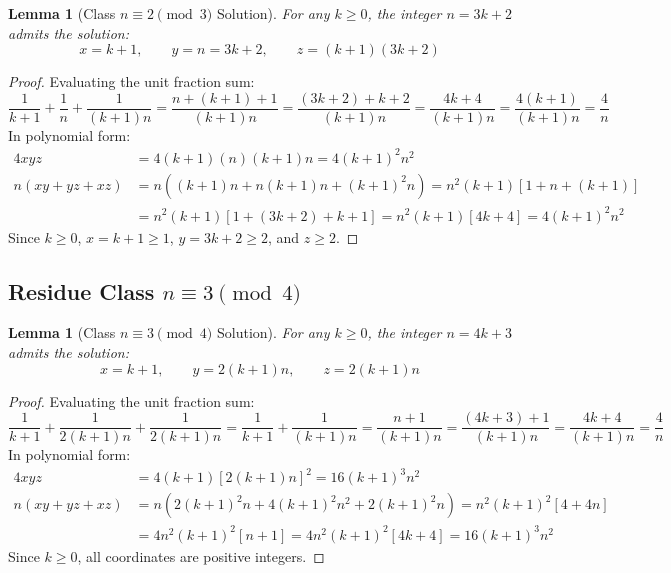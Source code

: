 \documentclass[11pt,a4paper]{article}
\newtheorem{lemma}[theorem]{Lemma}
\theoremstyle{definition}
\begin{document}
\begin{lemma}[Class $n \equiv 2 \pmod 3$ Solution]\label{lem:mod3_2}
For any $k \ge 0$, the integer $n = 3k + 2$ admits the solution:
\begin{equation}\label{eq:sol_mod3_2}
x = k + 1, \qquad y = n = 3k + 2, \qquad z = (k + 1)(3k + 2)
\end{equation}
\end{lemma}

\begin{proof}
Evaluating the unit fraction sum:
\[ \frac{1}{k+1} + \frac{1}{n} + \frac{1}{(k+1)n} = \frac{n + (k+1) + 1}{(k+1)n} = \frac{(3k+2) + k + 2}{(k+1)n} = \frac{4k+4}{(k+1)n} = \frac{4(k+1)}{(k+1)n} = \frac{4}{n} \]
In polynomial form:
\begin{align*}
4 x y z &= 4 (k+1)(n)(k+1)n = 4 (k+1)^2 n^2 \\
n (x y + y z + x z) &= n \left( (k+1)n + n(k+1)n + (k+1)^2 n \right) = n^2 (k+1) [ 1 + n + (k+1) ] \\
&= n^2 (k+1) [ 1 + (3k+2) + k + 1 ] = n^2 (k+1) [ 4k + 4 ] = 4 (k+1)^2 n^2
\end{align*}
Since $k \ge 0$, $x = k+1 \ge 1$, $y = 3k+2 \ge 2$, and $z \ge 2$.
\end{proof}

\subsection{Residue Class \texorpdfstring{$n \equiv 3 \pmod 4$}{n = 3 mod 4}}

\begin{lemma}[Class $n \equiv 3 \pmod 4$ Solution]\label{lem:mod4_3}
For any $k \ge 0$, the integer $n = 4k + 3$ admits the solution:
\begin{equation}\label{eq:sol_mod4_3}
x = k + 1, \qquad y = 2(k + 1)n, \qquad z = 2(k + 1)n
\end{equation}
\end{lemma}

\begin{proof}
Evaluating the unit fraction sum:
\[ \frac{1}{k+1} + \frac{1}{2(k+1)n} + \frac{1}{2(k+1)n} = \frac{1}{k+1} + \frac{1}{(k+1)n} = \frac{n + 1}{(k+1)n} = \frac{(4k+3) + 1}{(k+1)n} = \frac{4k+4}{(k+1)n} = \frac{4}{n} \]
In polynomial form:
\begin{align*}
4 x y z &= 4 (k+1) [2(k+1)n]^2 = 16 (k+1)^3 n^2 \\
n (x y + y z + x z) &= n \left( 2(k+1)^2 n + 4(k+1)^2 n^2 + 2(k+1)^2 n \right) = n^2 (k+1)^2 [ 4 + 4n ] \\
&= 4 n^2 (k+1)^2 [ n + 1 ] = 4 n^2 (k+1)^2 [ 4k + 4 ] = 16 (k+1)^3 n^2
\end{align*}
Since $k \ge 0$, all coordinates are positive integers.
\end{proof}
\end{document}
